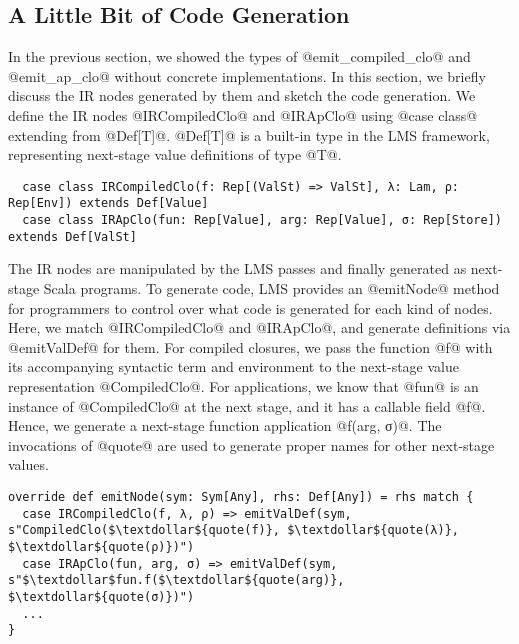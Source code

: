 \subsection{A Little Bit of Code Generation}

In the previous section, we showed the types of @emit_compiled_clo@ and
@emit_ap_clo@ without concrete implementations. In this section, we briefly
discuss the IR nodes generated by them and sketch the code generation.
We define the IR nodes @IRCompiledClo@ and @IRApClo@ using @case class@
extending from @Def[T]@. @Def[T]@ is a built-in type in the LMS framework,
representing next-stage value definitions of type @T@.
\begin{lstlisting}
  case class IRCompiledClo(f: Rep[(ValSt) => ValSt], λ: Lam, ρ: Rep[Env]) extends Def[Value]
  case class IRApClo(fun: Rep[Value], arg: Rep[Value], σ: Rep[Store]) extends Def[ValSt]
\end{lstlisting}

The IR nodes are manipulated by the LMS passes and finally generated as
next-stage Scala programs. To generate code, LMS provides an @emitNode@ method for
programmers to control over what code is generated for each kind of nodes. Here,
we match @IRCompiledClo@ and @IRApClo@, and generate definitions via
@emitValDef@ for them.  For compiled closures, we pass the function @f@ with its
accompanying syntactic term and environment to the next-stage value
representation @CompiledClo@. For applications, we know that @fun@ is
an instance of @CompiledClo@ at the next stage, and it has a callable field
@f@. Hence, we generate a next-stage function application @f(arg, σ)@.  The
invocations of @quote@ are used to generate proper names for other
next-stage values.
\begin{lstlisting}
override def emitNode(sym: Sym[Any], rhs: Def[Any]) = rhs match {
  case IRCompiledClo(f, λ, ρ) => emitValDef(sym, s"CompiledClo($\textdollar${quote(f)}, $\textdollar${quote(λ)}, $\textdollar${quote(ρ)})")
  case IRApClo(fun, arg, σ) => emitValDef(sym, s"$\textdollar$fun.f($\textdollar${quote(arg)}, $\textdollar${quote(σ)})")
  ...
}
\end{lstlisting}
